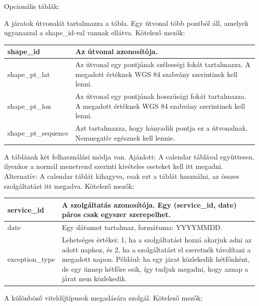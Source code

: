 Opcionális táblák:


A járatok útvonalát tartalmazza a tábla. Egy útvonal több pontból áll, amelyek ugyanazzal a shape\_id-val vannak ellátva.
Kötelező mezők:

\begin{tabular}{|p{3cm}|p{10cm}|}
\hline
shape\_id & Az útvonal azonosítója. \\
\hline
shape\_pt\_lat & Az útvonal egy pontjának szélességi fokát tartalmazza. A megadott értéknek WGS 84 szabvány szerintinek kell lenni. \\
\hline
shape\_pt\_lon & Az útvonal egy pontjának hosszúsági fokát tartalmazza. A megadott értéknek WGS 84 szabvány szerintinek kell lenni. \\
\hline
shape\_pt\_sequence & Azt tartalmazza, hogy hányadik pontja ez a útvonalnak. Nemnegatív egésznek kell lennie. \\
\hline
\end{tabular}


A táblának két felhasználási módja van.
Ajánlott: A calendar táblával együttesen, ilyenkor a normál menetrend szerinti kivételes eseteket kell itt megadni.
Alternatív: A calendar táblát kihagyva, csak ezt a táblát használni, az összes szolgáltatást itt megadva. 
Kötelező mezők:

\begin{tabular}{|p{3cm}|p{10cm}|}
\hline
service\_id & A szolgáltatás azonosítója. Egy (service\_id, date) páros csak egyszer szerepelhet. \\
\hline
date & Egy dátumot tartalmaz, formátuma: YYYYMMDD. \\
\hline
exception\_type & Lehetséges értékei:
1, ha a szolgáltatást hozzá akarjuk adni az adott naphoz, és
2, ha a szolgáltatást el szeretnék távolítani a megadott napon. Például: ha egy járat közlekedik hétfőnként, de egy ünnep hétfőre esik, így tudjuk megadni, hogy aznap a járat nem közlekedik. \\
\hline
\end{tabular}


A különböző viteldíjtípusok megadására szolgál.
Kötelező mezők:

